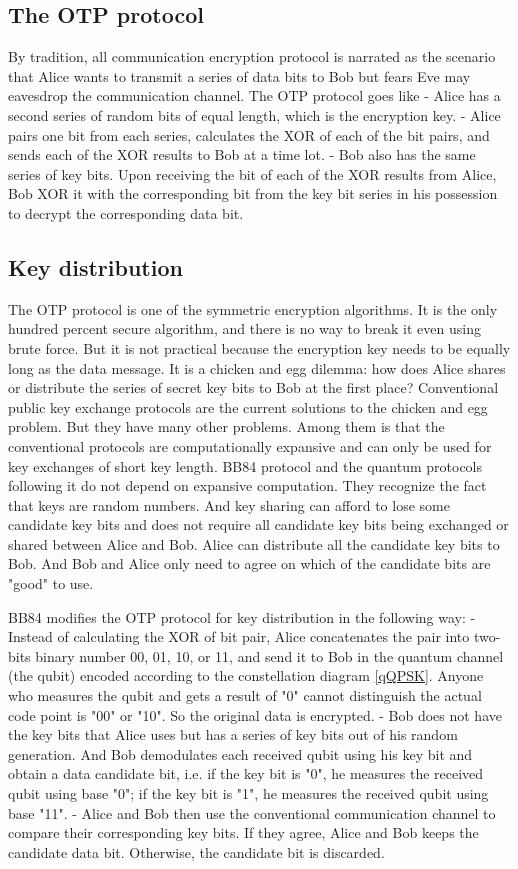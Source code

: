 \documentclass{book}
\begin{document}
\subsection{The OTP protocol}
By tradition, all communication encryption protocol is narrated as the scenario that Alice wants to transmit a series of data bits to Bob but fears Eve may eavesdrop the communication channel\cite{Schneier}. The OTP protocol goes like
- Alice has a second series of random bits of equal length, which is the encryption key.
- Alice pairs one bit from each series, calculates the XOR of each of the bit pairs, and sends each of the XOR results to Bob at a time lot.
- Bob also has the same series of key bits. Upon receiving the bit of each of the XOR results from Alice, Bob XOR it with the corresponding bit from the key bit series in his possession to decrypt the corresponding data bit.

\subsection{Key distribution}
The OTP protocol is one of the symmetric encryption algorithms. It is the only hundred percent secure algorithm, and there is no way to break it even using brute force. But it is not practical because the encryption key needs to be equally long as the data message. It is a chicken and egg dilemma: how does Alice shares or distribute the series of secret key bits to Bob at the first place? Conventional public key exchange protocols are the current solutions to the chicken and egg problem. But they have many other problems. Among them is that the conventional protocols are computationally expansive and can only be used for key exchanges of short key length. BB84 protocol and the quantum protocols following it do not depend on expansive computation. They recognize the fact that keys are random numbers. And key sharing can afford to lose some candidate key bits and does not require all candidate key bits being exchanged or shared between Alice and Bob. Alice can distribute all the candidate key bits to Bob. And Bob and Alice only need to agree on which of the candidate bits are "good" to use.

BB84 modifies the OTP protocol for key distribution in the following way:
- Instead of calculating the XOR of bit pair, Alice concatenates the pair into two-bits binary number 00, 01, 10, or 11, and send it to Bob in the quantum channel (the qubit) encoded according to the constellation diagram \ref{qQPSK}. Anyone who measures the qubit and gets a result of "0" cannot distinguish the actual code point is "00" or "10". So the original data is encrypted.
- Bob does not have the key bits that Alice uses but has a series of key bits out of his random generation. And Bob demodulates each received qubit using his key bit and obtain a data candidate bit, i.e. if the key bit is "0", he measures the received qubit using base "0"; if the key bit is "1", he measures the received qubit using base "11".
- Alice and Bob then use the conventional communication channel to compare their corresponding key bits. If they agree, Alice and Bob keeps the candidate data bit. Otherwise, the candidate bit is discarded.
\end{document}
